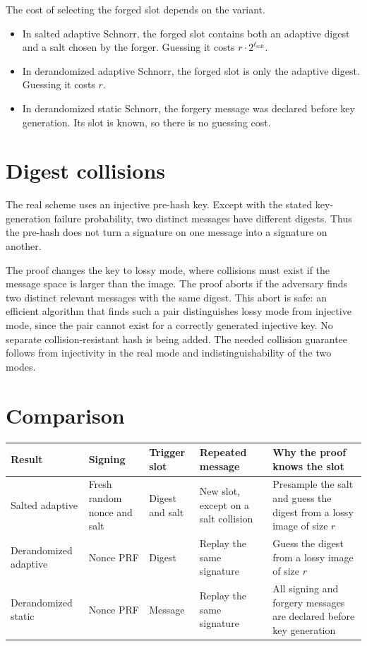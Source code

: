 \documentclass[11pt]{article}
\begin{document}
The cost of selecting the forged slot depends on the variant.

\begin{itemize}[leftmargin=2em]
\item In salted adaptive Schnorr, the forged slot contains both an adaptive
      digest and a salt chosen by the forger.  Guessing it costs
      \(r\cdot 2^{\ell_{\mathrm{salt}}}\).
\item In derandomized adaptive Schnorr, the forged slot is only the adaptive
      digest.  Guessing it costs \(r\).
\item In derandomized static Schnorr, the forgery message was declared before
      key generation.  Its slot is known, so there is no guessing cost.
\end{itemize}

\section{Digest collisions}

The real scheme uses an injective pre-hash key.  Except with the stated
key-generation failure probability, two distinct messages have different
digests.  Thus the pre-hash does not turn a signature on one message into a
signature on another.

The proof changes the key to lossy mode, where collisions must exist if the
message space is larger than the image.  The proof aborts if the adversary
finds two distinct relevant messages with the same digest.  This abort is
safe: an efficient algorithm that finds such a pair distinguishes lossy mode
from injective mode, since the pair cannot exist for a correctly generated
injective key.  No separate collision-resistant hash is being added.  The
needed collision guarantee follows from injectivity in the real mode and
indistinguishability of the two modes.

\section{Comparison}

\begin{center}
\small
\begin{tabularx}{\textwidth}{@{}>{\raggedright\arraybackslash}p{}
                              YYYY@{}}
\toprule
Result
& Signing
& Trigger slot
& Repeated message
& Why the proof knows the slot\\
\midrule
Salted adaptive
& Fresh random nonce and salt
& Digest and salt
& New slot, except on a salt collision
& Presample the salt and guess the digest from a lossy image of size \(r\)\\
\addlinespace
Derandomized adaptive
& Nonce PRF
& Digest
& Replay the same signature
& Guess the digest from a lossy image of size \(r\)\\
\addlinespace
Derandomized static
& Nonce PRF
& Message
& Replay the same signature
& All signing and forgery messages are declared before key generation\\
\bottomrule
\end{tabularx}
\end{center}
\end{document}

